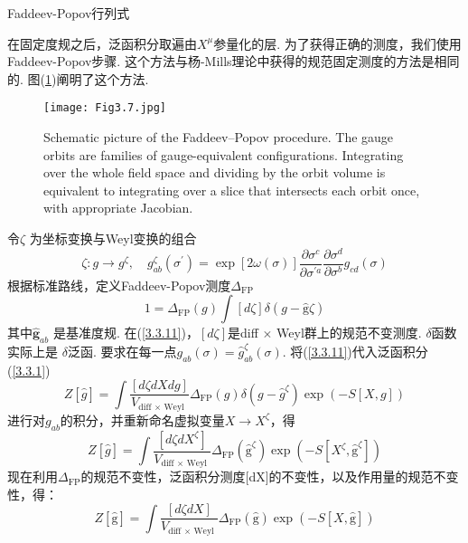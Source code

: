 \centerline{\Large Faddeev-Popov行列式}
在固定度规之后，泛函积分取遍由$X^\mu$参量化的层. 为了获得正确的测度，我们使用Faddeev-Popov步骤. 这个方法与杨-Mills理论中获得的规范固定测度的方法是相同的. 图(\ref{Fig3.7})阐明了这个方法.
\begin{figure}
	\begin{center}
		\texttt{[image: Fig3.7.jpg]}\\
\caption{Schematic picture of the Faddeev–Popov procedure. The gauge orbits	are families of gauge-equivalent configurations. Integrating over the whole field space and dividing by the orbit volume is equivalent to integrating over a slice that intersects each orbit once, with appropriate Jacobian.}\label{Fig3.7}
	\end{center}
\end{figure}
令$\zeta$ 为坐标变换与Weyl变换的组合
\begin{equation}
\zeta: g \rightarrow g^{\zeta}, \quad g_{a b}^{\zeta}\left(\sigma^{\prime}\right)=\exp [2 \omega(\sigma)] \frac{\partial \sigma^{c}}{\partial \sigma^{\prime a}} \frac{\partial \sigma^{d}}{\partial \sigma^{b}} g_{c d}(\sigma)
\end{equation}
根据标准路线，定义Faddeev-Popov测度$\Delta_{\mathrm{FP}}$
\begin{equation}\label{3.3.11}
1=\Delta_{\mathrm{FP}}(g) \int[d \zeta] \delta(g-\hat{\mathrm{g}} \zeta)
\end{equation}
其中$\hat{\boldsymbol{g}}_{a b}$ 是基准度规. 在(\ref{3.3.11})，$[d \zeta]$是diff $\times$ Weyl群上的规范不变测度. $\delta$函数实际上是 $\delta$泛函. 要求在每一点$g_{a b}(\sigma)=\hat{g}_{a b}^{\zeta}(\sigma)$. 将(\ref{3.3.11})代入泛函积分(\ref{3.3.1})
\begin{equation}
Z[\hat{g}]=\int \frac{[d \zeta d X d g]}{V_{\text {diff } \times \text { Weyl }}} \Delta_{\mathrm{FP}}(g) \delta\left(g-\hat{g}^{\zeta}\right) \exp (-S[X, g])
\end{equation}
进行对$g_{ab}$的积分，并重新命名虚拟变量$X \rightarrow X^{\zeta}$，得
\begin{equation}
Z[\hat{g}]=\int \frac{\left[d \zeta d X^{\zeta}\right]}{V_{\text {diff } \times \text { Weyl }}} \Delta_{\mathrm{FP}}\left(\hat{\mathrm{g}}^{\zeta}\right) \exp \left(-S\left[X^{\zeta}, \hat{\mathrm{g}}^{\zeta}\right]\right)
\end{equation}
现在利用$\Delta_{\mathrm{FP}}$的规范不变性，泛函积分测度[dX]的不变性，以及作用量的规范不变性，得：
\begin{equation}
Z[\hat{\mathrm{g}}]=\int \frac{[d \zeta d X]}{V_{\text {diff } \times \text { Weyl }}} \Delta_{\mathrm{FP}}(\hat{\mathrm{g}}) \exp (-S[X, \hat{\mathrm{g}}])
\end{equation}
